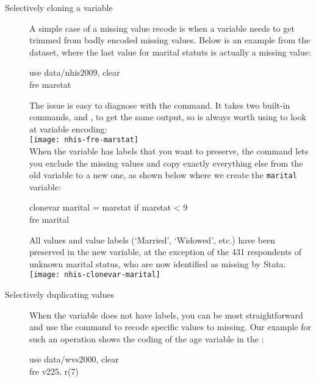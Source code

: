 \begin{description}
	\item[Selectively cloning a variable]%
	A simple case of a missing value recode is when a variable needs to get trimmed from badly encoded missing values. Below is an example from the \NHIS dataset, where the last value for marital statuts is actually a missing value:

	\begin{docspec}
		use data/nhis2009, clear\\
		fre marstat
	\end{docspec}

	The issue is easy to diagnose with the  command. It takes two built-in commands,  and , to get the same output, so  is always worth using to look at variable encoding:\\[1em]

	\texttt{[image: nhis-fre-marstat]}\\[1em]

	When the variable has labels that you want to preserve, the  command lets you exclude the missing values and copy exactly everything else from the old variable to a new one, as shown below where we create the \texttt{marital} variable:

	\begin{docspec}
		clonevar marital = marstat if marstat < 9\\
		fre marital
	\end{docspec}

	All values and value labels (`Married', `Widowed', etc.) have been preserved in the new variable, at the exception of the 431 respondents of unknown marital status, who are now identified as missing by Stata:\\[1em]

	\texttt{[image: nhis-clonevar-marital]}\\[1em]

	\item[Selectively duplicating values]%
	When the variable does not have labels, you can be most straightforward and use the  command to recode specific values to missing. Our example for such an operation shows the coding of the age variable in the \wvs:

	\begin{docspec}
		use data/wvs2000, clear\\
		fre v225, r(7)
	\end{docspec}
	

\end{description}
